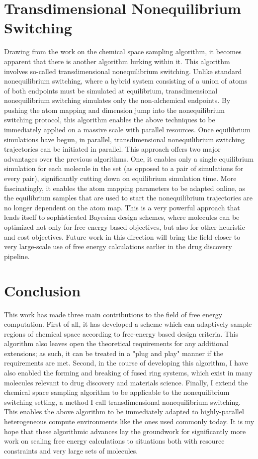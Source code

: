 \section{Transdimensional Nonequilibrium Switching}
%
Drawing from the work on the chemical space sampling algorithm, it becomes apparent that there is another algorithm lurking within it.
%
This algorithm involves so-called transdimensional nonequilibrium switching.
%
Unlike standard nonequilibrium switching, where a hybrid system consisting of a union of atoms of both endpoints must be simulated at equilibrium, transdimensional nonequilibrium switching simulates only the non-alchemical endpoints.
%
By pushing the atom mapping and dimension jump into the nonequilibrium switching protocol, this algorithm enables the above techniques to be immediately applied on a massive scale with parallel resources.
%
Once equilibrium simulations have begun, in parallel, transdimensional nonequilibrium switching trajectories can be initiated in parallel.
%
This approach offers two major advantages over the previous algorithms.
%
One, it enables only a single equilibrium simulation for each molecule in the set (as opposed to a pair of simulations for every pair), significantly cutting down on equilibrium simulation time.
%
More fascinatingly, it enables the atom mapping parameters to be adapted online, as the equilibrium samples that are used to start the nonequilibrium trajectories are no longer dependent on the atom map.
%
This is a very powerful approach that lends itself to sophisticated Bayesian design schemes, where molecules can be optimized not only for free-energy based objectives, but also for other heuristic and cost objectives.
%
Future work in this direction will bring the field closer to very large-scale use of free energy calculations earlier in the drug discovery pipeline.
%
\section{Conclusion}
%
This work has made three main contributions to the field of free energy computation.
%
First of all, it has developed a scheme which can adaptively sample regions of chemical space according to free-energy based design criteria.
%
This algorithm also leaves open the theoretical requirements for any additional extensions; as such, it can be treated in a "plug and play" manner if the requirements are met.
%
Second, in the course of developing this algorithm, I have also enabled the forming and breaking of fused ring systems, which exist in many molecules relevant to drug discovery and materials science.
%
Finally, I extend the chemical space sampling algorithm to be applicable to the nonequilibrium switching setting, a method I call transdimensional nonequilibrium switching.
%
This enables the above algorithm to be immediately adapted to highly-parallel heterogeneous compute environments like the ones used commonly today.
%
It is my hope that these algorithmic advances lay the groundwork for significantly more work on scaling free energy calculations to situations both with resource constraints and very large sets of molecules.